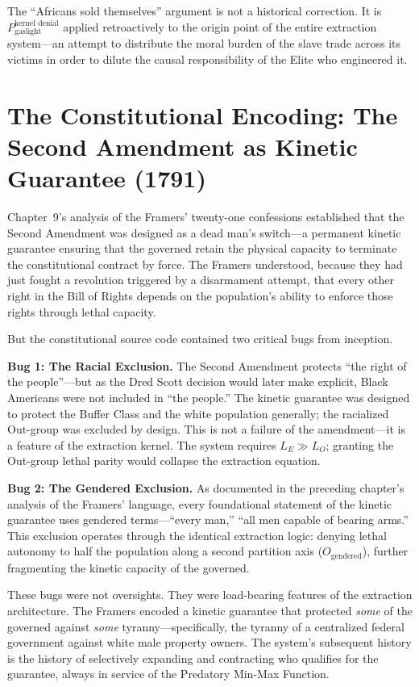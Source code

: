 \documentclass[12pt,openany]{book}
\begin{document}
The ``Africans sold themselves'' argument is not a historical correction. It is $P_{\text{gaslight}}^{\text{kernel denial}}$ applied retroactively to the origin point of the entire extraction system---an attempt to distribute the moral burden of the slave trade across its victims in order to dilute the causal responsibility of the Elite who engineered it.

\section{The Constitutional Encoding: The Second Amendment as Kinetic Guarantee (1791)}

Chapter~9's analysis of the Framers' twenty-one confessions established that the Second Amendment was designed as a dead man's switch---a permanent kinetic guarantee ensuring that the governed retain the physical capacity to terminate the constitutional contract by force. The Framers understood, because they had just fought a revolution triggered by a disarmament attempt, that every other right in the Bill of Rights depends on the population's ability to enforce those rights through lethal capacity.

But the constitutional source code contained two critical bugs from inception.

\textbf{Bug 1: The Racial Exclusion.} The Second Amendment protects ``the right of the people''---but as the Dred Scott decision would later make explicit, Black Americans were not included in ``the people.'' The kinetic guarantee was designed to protect the Buffer Class and the white population generally; the racialized Out-group was excluded by design. This is not a failure of the amendment---it is a feature of the extraction kernel. The system requires $L_E \gg L_O$; granting the Out-group lethal parity would collapse the extraction equation.

\textbf{Bug 2: The Gendered Exclusion.} As documented in the preceding chapter's analysis of the Framers' language, every foundational statement of the kinetic guarantee uses gendered terms---``every man,'' ``all men capable of bearing arms.'' This exclusion operates through the identical extraction logic: denying lethal autonomy to half the population along a second partition axis ($O_{\text{gendered}}$), further fragmenting the kinetic capacity of the governed.

These bugs were not oversights. They were load-bearing features of the extraction architecture. The Framers encoded a kinetic guarantee that protected \textit{some} of the governed against \textit{some} tyranny---specifically, the tyranny of a centralized federal government against white male property owners. The system's subsequent history is the history of selectively expanding and contracting who qualifies for the guarantee, always in service of the Predatory Min-Max Function.
\end{document}
